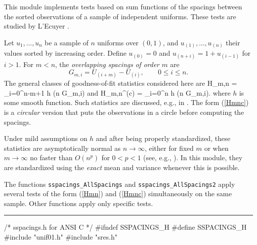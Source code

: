 
This module implements tests based on sum functions of the spacings
between the sorted observations of a sample of independent uniforms.
These tests are studied by L'Ecuyer \cite{rLEC97h}.

Let $u_1,\dots,u_n$ be a sample of $n$ uniforms over $(0,1)$, and
$u_{(1)},\dots, u_{(n)}$ their values sorted by increasing order.
Define $u_{(0)} = 0$ and $u_{(n+i)} = 1 + u_{(i-1)}$ for $i > 1$.
For $m<n$, the {\em overlapping spacings of order $m$\/} are 
 $$ G_{m,i} = U_{(i+m)} - U_{(i)},  \qquad  0\le i\le n. $$
The general classes of goodness-of-fit statistics considered here are 
\eq
   H_{m,n} = \sum_{i=0}^{n-m+1} h (n G_{m,i})               
\endeq
and
\eq
   H_{m,n}^{(c)} = \sum_{i=0}^n h (n G_{m,i}).              
\endeq
where $h$ is some smooth function.
Such statistics are discussed, e.g., in 
\cite{tPYK65a,tKUO81a,tRAO84a,tHAL86a,rLEC97h}.
The form (\ref{Hmnc}) is a {\em circular\/} version that puts the 
observations in a circle before computing the spacings.

Under mild assumptions on $h$ and after being properly standardized,
these statistics are asymptotically normal as $n\to\infty$, 
either for fixed $m$ or when $m\to\infty$ no faster than $O(n^p)$ 
for $0 < p < 1$ (see, e.g., \cite{tDEL79a,tHAL86a,tJAM89a,tKUO81a}).
In this module, they are standardized using the {\em exact\/} mean 
and variance whenever this is possible.

The functions {\tt sspacings\_AllSpacings} and {\tt sspacings\_AllSpacings2}
apply several tests of the form (\ref{Hmn}) and (\ref{Hmnc}) simultaneously
on the same sample. 
Other functions apply only specific tests.

\resdef

\bigskip
\hrule
\code\hide
/* sspacings.h  for ANSI C */
#ifndef SSPACINGS_H
#define SSPACINGS_H
\endhide
#include "unif01.h"
#include "sres.h"
\endcode

\ifdetailed   %

\code

